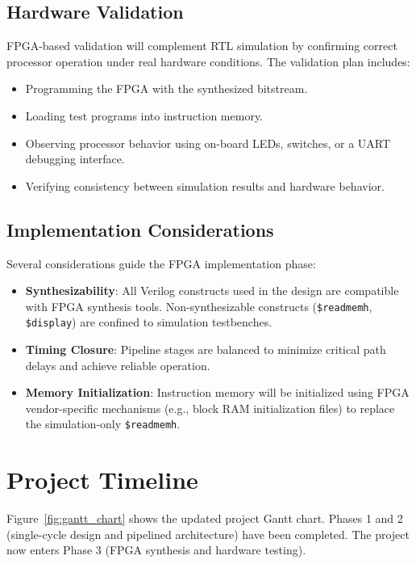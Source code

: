\documentclass[12pt,a4paper]{report}
\begin{document}
\section{Hardware Validation}
FPGA-based validation will complement RTL simulation by confirming correct processor
operation under real hardware conditions. The validation plan includes:

\begin{itemize}
    \item Programming the FPGA with the synthesized bitstream.
    \item Loading test programs into instruction memory.
    \item Observing processor behavior using on-board LEDs, switches, or a UART
          debugging interface.
    \item Verifying consistency between simulation results and hardware behavior.
\end{itemize}

\section{Implementation Considerations}
Several considerations guide the FPGA implementation phase:

\begin{itemize}
    \item \textbf{Synthesizability}: All Verilog constructs used in the design are
          compatible with FPGA synthesis tools. Non-synthesizable constructs
          (\texttt{\$readmemh}, \texttt{\$display}) are confined to simulation
          testbenches.
    \item \textbf{Timing Closure}: Pipeline stages are balanced to minimize critical
          path delays and achieve reliable operation.
    \item \textbf{Memory Initialization}: Instruction memory will be initialized
          using FPGA vendor-specific mechanisms (e.g., block RAM initialization
          files) to replace the simulation-only \texttt{\$readmemh}.
\end{itemize}


\chapter{Project Timeline}

Figure~\ref{fig:gantt_chart} shows the updated project Gantt chart. Phases 1 and 2
(single-cycle design and pipelined architecture) have been completed. The project now
enters Phase 3 (FPGA synthesis and hardware testing).
\end{document}
